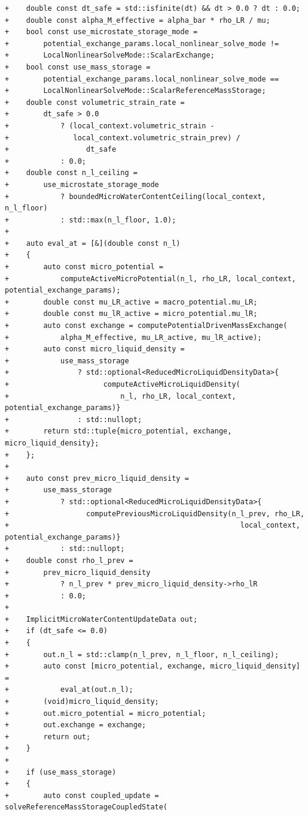 \documentclass[10pt]{article}
\begin{document}
\begin{lstlisting}
+    double const dt_safe = std::isfinite(dt) && dt > 0.0 ? dt : 0.0;
+    double const alpha_M_effective = alpha_bar * rho_LR / mu;
+    bool const use_microstate_storage_mode =
+        potential_exchange_params.local_nonlinear_solve_mode !=
+        LocalNonlinearSolveMode::ScalarExchange;
+    bool const use_mass_storage =
+        potential_exchange_params.local_nonlinear_solve_mode ==
+        LocalNonlinearSolveMode::ScalarReferenceMassStorage;
+    double const volumetric_strain_rate =
+        dt_safe > 0.0
+            ? (local_context.volumetric_strain -
+               local_context.volumetric_strain_prev) /
+                  dt_safe
+            : 0.0;
+    double const n_l_ceiling =
+        use_microstate_storage_mode
+            ? boundedMicroWaterContentCeiling(local_context, n_l_floor)
+            : std::max(n_l_floor, 1.0);
+
+    auto eval_at = [&](double const n_l)
+    {
+        auto const micro_potential =
+            computeActiveMicroPotential(n_l, rho_LR, local_context, potential_exchange_params);
+        double const mu_LR_active = macro_potential.mu_LR;
+        double const mu_lR_active = micro_potential.mu_lR;
+        auto const exchange = computePotentialDrivenMassExchange(
+            alpha_M_effective, mu_LR_active, mu_lR_active);
+        auto const micro_liquid_density =
+            use_mass_storage
+                ? std::optional<ReducedMicroLiquidDensityData>{
+                      computeActiveMicroLiquidDensity(
+                          n_l, rho_LR, local_context, potential_exchange_params)}
+                : std::nullopt;
+        return std::tuple{micro_potential, exchange, micro_liquid_density};
+    };
+
+    auto const prev_micro_liquid_density =
+        use_mass_storage
+            ? std::optional<ReducedMicroLiquidDensityData>{
+                  computePreviousMicroLiquidDensity(n_l_prev, rho_LR,
+                                                      local_context, potential_exchange_params)}
+            : std::nullopt;
+    double const rho_l_prev =
+        prev_micro_liquid_density
+            ? n_l_prev * prev_micro_liquid_density->rho_lR
+            : 0.0;
+
+    ImplicitMicroWaterContentUpdateData out;
+    if (dt_safe <= 0.0)
+    {
+        out.n_l = std::clamp(n_l_prev, n_l_floor, n_l_ceiling);
+        auto const [micro_potential, exchange, micro_liquid_density] =
+            eval_at(out.n_l);
+        (void)micro_liquid_density;
+        out.micro_potential = micro_potential;
+        out.exchange = exchange;
+        return out;
+    }
+
+    if (use_mass_storage)
+    {
+        auto const coupled_update = solveReferenceMassStorageCoupledState(

\end{lstlisting}
\end{document}
